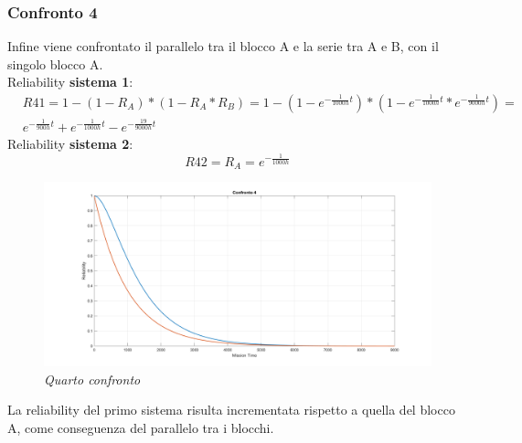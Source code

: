 \subsubsection{Confronto 4}
Infine viene confrontato il parallelo tra il blocco A e la serie tra A e B, con il singolo blocco A.
\\
Reliability \textbf{sistema 1}:
\begin{equation*}
	\begin{split}
		&R41 = 1-(1-R_A)*(1-R_A*R_B) = 1-(1-e^{-\frac{1}{1000h} t})*(1-e^{-\frac{1}{1000h} t}*e^{-\frac{1}{9000h} t}) = \\
		&e^{-\frac{1}{900h}t}+e^{-\frac{1}{1000h}t}-e^{-\frac{19}{9000h}t}
	\end{split}
\end{equation*}
Reliability \textbf{sistema 2}:
\begin{equation*}
	R42 = R_A = e^{-\frac{1}{1000h}}
\end{equation*}
\begin{figure}[H]
	\centering
	\includegraphics[width=\textwidth]{img/hw5/es4_4.png}
	\caption{\textit{Quarto confronto}}
\end{figure}
La reliability del primo sistema risulta incrementata rispetto a quella del blocco A, come conseguenza del parallelo tra i blocchi.
